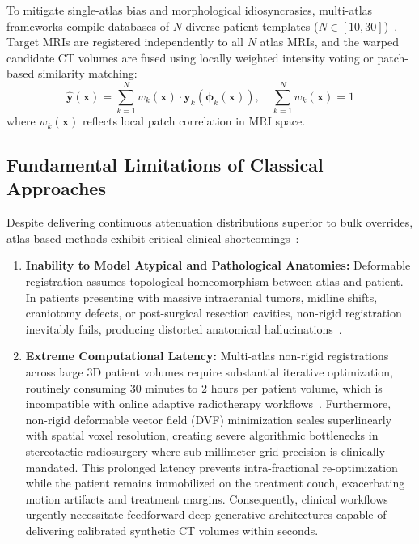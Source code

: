To mitigate single-atlas bias and morphological idiosyncrasies, multi-atlas frameworks compile databases of $N$ diverse patient templates ($N \in [10, 30]$)~\cite{sjolund2015comprehensive,burgos2014multi}. Target MRIs are registered independently to all $N$ atlas MRIs, and the warped candidate CT volumes are fused using locally weighted intensity voting or patch-based similarity matching:
\begin{equation}
\mathbf{\hat{y}}(\mathbf{x}) = \sum_{k=1}^N w_k(\mathbf{x}) \cdot \mathbf{y}_k(\boldsymbol{\phi}_k(\mathbf{x})), \quad \sum_{k=1}^N w_k(\mathbf{x}) = 1
\label{eq:multi_atlas}
\end{equation}
where $w_k(\mathbf{x})$ reflects local patch correlation in MRI space.

\subsection{Fundamental Limitations of Classical Approaches}
Despite delivering continuous attenuation distributions superior to bulk overrides, atlas-based methods exhibit critical clinical shortcomings~\cite{edmund2017review,thummerer2023synthrad2023}:
\begin{enumerate}[label=\textbf{(\arabic*)}]
    \item \textbf{Inability to Model Atypical and Pathological Anatomies:} Deformable registration assumes topological homeomorphism between atlas and patient. In patients presenting with massive intracranial tumors, midline shifts, craniotomy defects, or post-surgical resection cavities, non-rigid registration inevitably fails, producing distorted anatomical hallucinations~\cite{edmund2017review}.
    \item \textbf{Extreme Computational Latency:} Multi-atlas non-rigid registrations across large 3D patient volumes require substantial iterative optimization, routinely consuming 30 minutes to 2 hours per patient volume, which is incompatible with online adaptive radiotherapy workflows~\cite{sjolund2015comprehensive}. Furthermore, non-rigid deformable vector field (DVF) minimization scales superlinearly with spatial voxel resolution, creating severe algorithmic bottlenecks in stereotactic radiosurgery where sub-millimeter grid precision is clinically mandated. This prolonged latency prevents intra-fractional re-optimization while the patient remains immobilized on the treatment couch, exacerbating motion artifacts and treatment margins. Consequently, clinical workflows urgently necessitate feedforward deep generative architectures capable of delivering calibrated synthetic CT volumes within seconds.
\end{enumerate}

